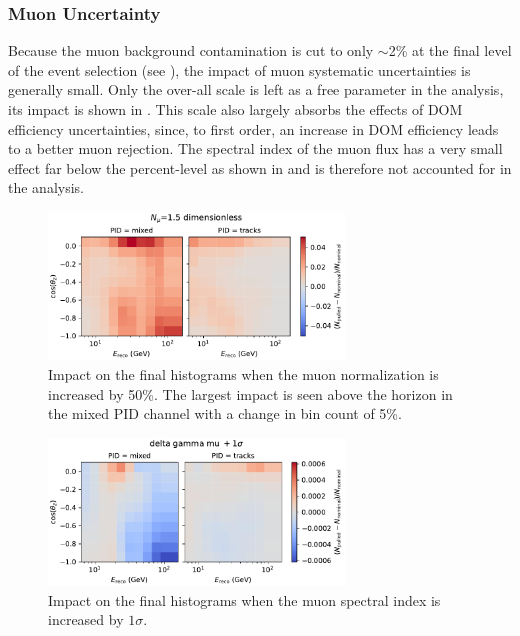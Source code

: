 \subsubsection{Muon Uncertainty}
\label{sec:atm-muons-systematic}
Because the muon background contamination is cut to only $\sim$2\% at the final level of the event selection (see ), the impact of muon systematic uncertainties is generally small.
Only the over-all scale is left as a free parameter in the analysis, its impact is shown in .
This scale also largely absorbs the effects of DOM efficiency uncertainties, since, to first order, an increase in DOM efficiency leads to a better muon rejection.
The spectral index of the muon flux has a very small effect far below the percent-level as shown in  and is therefore not accounted for in the analysis.

\begin{figure}
    \centering
    \includegraphics[width=0.7\textwidth,trim={0 0 0 0.6cm},clip]{figures/measurement/systematics/muons/weight_scale.pdf}
    \caption{Impact on the final histograms when the muon normalization is increased by 50\%. The largest impact is seen above the horizon in the mixed PID channel with a change in bin count of 5\%.}
    \label{fig:weight-scale-syst}
\end{figure}

\begin{figure}
    \centering
    \includegraphics[width=0.7\textwidth,trim={0 0 0 0.6cm},clip]{figures/measurement/systematics/muons/delta_gamma_mu.pdf}
    \caption{Impact on the final histograms when the muon spectral index is increased by $1\sigma$.}
    \label{fig:delta-gamma-mu-syst}
\end{figure}


